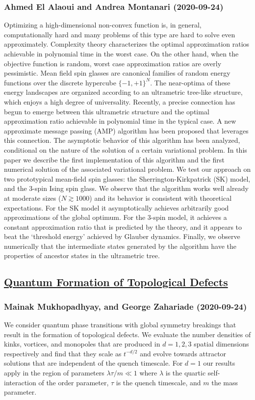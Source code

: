 \subsubsection*{Ahmed El Alaoui and Andrea Montanari (2020-09-24)}
Optimizing a high-dimensional non-convex function is, in general,
computationally hard and many problems of this type are hard to solve even
approximately. Complexity theory characterizes the optimal approximation ratios
achievable in polynomial time in the worst case. On the other hand, when the
objective function is random, worst case approximation ratios are overly
pessimistic. Mean field spin glasses are canonical families of random energy
functions over the discrete hypercube $\{-1,+1\}^N$. The near-optima of these
energy landscapes are organized according to an ultrametric tree-like
structure, which enjoys a high degree of universality. Recently, a precise
connection has begun to emerge between this ultrametric structure and the
optimal approximation ratio achievable in polynomial time in the typical case.
A new approximate message passing (AMP) algorithm has been proposed that
leverages this connection. The asymptotic behavior of this algorithm has been
analyzed, conditional on the nature of the solution of a certain variational
problem.
  In this paper we describe the first implementation of this algorithm and the
first numerical solution of the associated variational problem. We test our
approach on two prototypical mean-field spin glasses: the
Sherrington-Kirkpatrick (SK) model, and the $3$-spin Ising spin glass. We
observe that the algorithm works well already at moderate sizes ($N\gtrsim
1000$) and its behavior is consistent with theoretical expectations. For the SK
model it asymptotically achieves arbitrarily good approximations of the global
optimum. For the $3$-spin model, it achieves a constant approximation ratio
that is predicted by the theory, and it appears to beat the `threshold energy'
achieved by Glauber dynamics. Finally, we observe numerically that the
intermediate states generated by the algorithm have the properties of ancestor
states in the ultrametric tree.

\subsection*{\href{http://arxiv.org/abs/2009.11480v1}{Quantum Formation of Topological Defects}}
\subsubsection*{Mainak Mukhopadhyay, and George Zahariade (2020-09-24)}
We consider quantum phase transitions with global symmetry breakings that
result in the formation of topological defects. We evaluate the number
densities of kinks, vortices, and monopoles that are produced in $d=1,2,3$
spatial dimensions respectively and find that they scale as $t^{-d/2}$ and
evolve towards attractor solutions that are independent of the quench
timescale. For $d=1$ our results apply in the region of parameters $\lambda
\tau/m \ll 1$ where $\lambda$ is the quartic self-interaction of the order
parameter, $\tau$ is the quench timescale, and $m$ the mass parameter.

